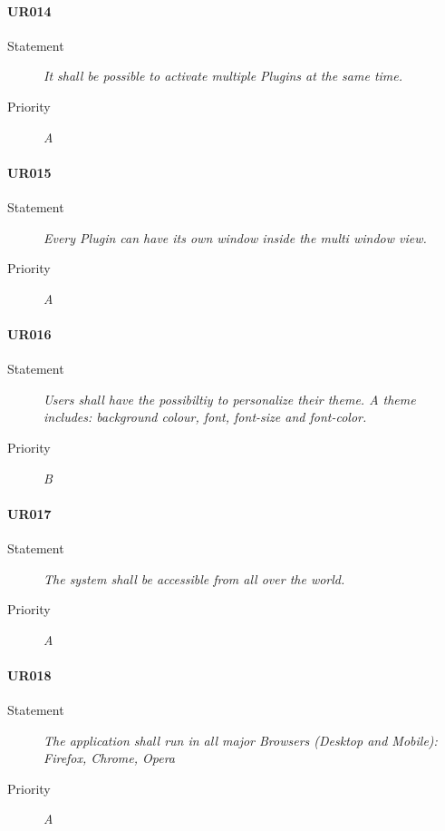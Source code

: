 \paragraph{UR014}
\begin{description}
\item[Statement] \textit{It shall be possible to activate multiple
    \gls{Plugins} at the same time.}
\item[Priority] \textit{A}
\end{description}

\paragraph{UR015}
\begin{description}
  \item[Statement]
    \textit{Every Plugin can have its own window inside the multi window view.}
  \item[Priority]
    \textit{A}
\end{description}

\paragraph{UR016}
\begin{description}
\item[Statement] \textit{Users shall have the possibiltiy to personalize
    their theme. A theme includes: background colour, font, font-size and
    font-color.}
\item[Priority] \textit{B}
\end{description}


\paragraph{UR017}
\begin{description}
\item[Statement] \textit{The system shall be accessible from all over the
    world.}
\item[Priority] \textit{A}
\end{description}

\paragraph{UR018}
\begin{description}
  \item[Statement]
    \textit{The application shall run in all major Browsers (Desktop
      and Mobile): Firefox,
      Chrome, Opera}
  \item[Priority]
    \textit{A}
\end{description}

